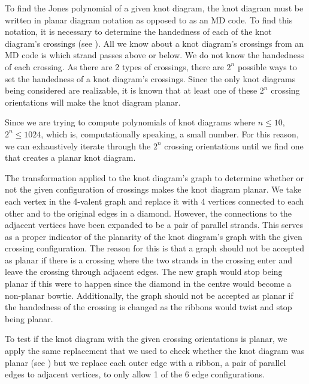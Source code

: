\begin{paper}


To find the Jones polynomial of a given knot diagram, the knot diagram must be
written in planar diagram notation as opposed to as an MD code.
To find this notation, it is necessary to determine the handedness of each of
the knot diagram's crossings (see \figCrossings).
All we know about a knot diagram's crossings from an MD code is which strand
passes above or below.
We do not know the handedness of each crossing.
As there are 2 types of crossings, there are $2^n$ possible ways to set the
handedness of a knot diagram's crossings.
Since the only knot diagrams being considered are realizable, it is known that
at least one of these $2^n$ crossing orientations will make the knot diagram
planar.

Since we are trying to compute polynomials of knot diagrams where $n\leq10$,
$2^n\leq1024$, which is, computationally speaking, a small number.
For this reason, we can exhaustively iterate through the $2^n$ crossing
orientations until we find one that creates a planar knot diagram.

{The transformation applied to the knot diagram's graph to determine whether or
not the given configuration of crossings makes the knot diagram planar.
We take each vertex in the 4-valent graph and replace it with 4 vertices
connected to each other and to the original edges in a diamond.
However, the connections to the adjacent vertices have been expanded to be a
pair of parallel strands.
This serves as a proper indicator of the planarity of the knot diagram's graph
with the given crossing configuration.
The reason for this is that a graph should not be accepted as planar if there is
a crossing where the two strands in the crossing enter and leave the crossing
through adjacent edges.
The new graph would stop being planar if this were to happen since the diamond
in the centre would become a non-planar bowtie.
Additionally, the graph should not be accepted as planar if the handedness of
the crossing is changed as the ribbons would twist and stop being planar.}

To test if the knot diagram with the given crossing orientations is planar, we
apply the same replacement that we used to check whether the knot diagram was
planar (see \figRibbon) but we replace each outer edge with a ribbon, a pair of
parallel edges to adjacent vertices, to only
allow 1 of the 6 edge configurations.


\end{paper}

